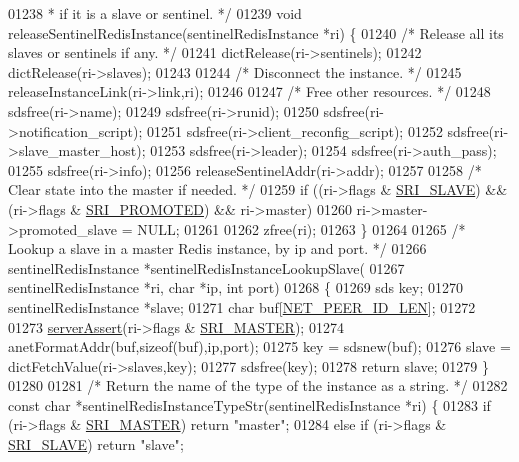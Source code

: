 \begin{DoxyCode}
{{{{{{{{{{{{{{{{01238 \textcolor{comment}{ * if it is a slave or sentinel. */}
01239 \textcolor{keywordtype}{void} releaseSentinelRedisInstance(sentinelRedisInstance *ri) \{
01240     \textcolor{comment}{/* Release all its slaves or sentinels if any. */}
01241     dictRelease(ri->sentinels);
01242     dictRelease(ri->slaves);
01243 
01244     \textcolor{comment}{/* Disconnect the instance. */}
01245     releaseInstanceLink(ri->link,ri);
01246 
01247     \textcolor{comment}{/* Free other resources. */}
01248     sdsfree(ri->name);
01249     sdsfree(ri->runid);
01250     sdsfree(ri->notification\_script);
01251     sdsfree(ri->client\_reconfig\_script);
01252     sdsfree(ri->slave\_master\_host);
01253     sdsfree(ri->leader);
01254     sdsfree(ri->auth\_pass);
01255     sdsfree(ri->info);
01256     releaseSentinelAddr(ri->addr);
01257 
01258     \textcolor{comment}{/* Clear state into the master if needed. */}
01259     \textcolor{keywordflow}{if} ((ri->flags & \hyperlink{sentinel_8c_a4b9db21eda79d49bd9fdf2cf7b3178e8}{SRI\_SLAVE}) && (ri->flags & \hyperlink{sentinel_8c_a6c6c019b1af48a9c0e9507422051c684}{SRI\_PROMOTED}) && ri->master)
01260         ri->master->promoted\_slave = NULL;
01261 
01262     zfree(ri);
01263 \}
01264 
01265 \textcolor{comment}{/* Lookup a slave in a master Redis instance, by ip and port. */}
01266 sentinelRedisInstance *sentinelRedisInstanceLookupSlave(
01267                 sentinelRedisInstance *ri, \textcolor{keywordtype}{char} *ip, \textcolor{keywordtype}{int} port)
01268 \{
01269     sds key;
01270     sentinelRedisInstance *slave;
01271     \textcolor{keywordtype}{char} buf[\hyperlink{server_8h_a39a30f77e23c1994e70b6c9bc892dee9}{NET\_PEER\_ID\_LEN}];
01272 
01273     \hyperlink{server_8h_a88114b5169b4c382df6b56506285e56a}{serverAssert}(ri->flags & \hyperlink{sentinel_8c_a2ee83e5ff67b45746cd6a310f15334b2}{SRI\_MASTER});
01274     anetFormatAddr(buf,\textcolor{keyword}{sizeof}(buf),ip,port);
01275     key = sdsnew(buf);
01276     slave = dictFetchValue(ri->slaves,key);
01277     sdsfree(key);
01278     \textcolor{keywordflow}{return} slave;
01279 \}
01280 
01281 \textcolor{comment}{/* Return the name of the type of the instance as a string. */}
01282 \textcolor{keyword}{const} \textcolor{keywordtype}{char} *sentinelRedisInstanceTypeStr(sentinelRedisInstance *ri) \{
01283     \textcolor{keywordflow}{if} (ri->flags & \hyperlink{sentinel_8c_a2ee83e5ff67b45746cd6a310f15334b2}{SRI\_MASTER}) \textcolor{keywordflow}{return} \textcolor{stringliteral}{"master"};
01284     \textcolor{keywordflow}{else} \textcolor{keywordflow}{if} (ri->flags & \hyperlink{sentinel_8c_a4b9db21eda79d49bd9fdf2cf7b3178e8}{SRI\_SLAVE}) \textcolor{keywordflow}{return} \textcolor{stringliteral}{"slave"};
}}}}}}}}}}}}}}}}
\end{DoxyCode}
